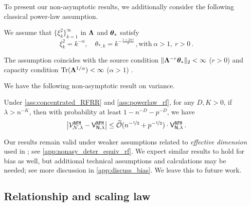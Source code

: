 To present our non-asymptotic results, we additionally consider the following classical power-law assumption.

\begin{assumption}
\label{ass:powerlaw_rf}
    We assume that $\{ \xi_k^2\}_{k=1}^{\infty}$ in ${\boldsymbol \Lambda}$ and ${\boldsymbol \theta}_*$ satisfy
    \[
    \xi_k^2 = k^{-\alpha}, \quad \theta_{\ast, k} = k^{-\frac{1 + 2\alpha\tau}{2}}\,, \mbox{with}~\alpha > 1,~ r>0\,.
    \]
\end{assumption}

The assumption coincides with the source condition $\|{\boldsymbol \Lambda}^{-r} {\boldsymbol \theta}_*\|_2 < \infty$ ($r>0$) and capacity condition ${\rm Tr}({\boldsymbol \Lambda}^{1/\alpha}) < \infty$ ($\alpha > 1$) \citep{caponnetto2007optimal}.

We have the following non-asymptotic result on variance. 
\begin{theorem}\label{prop:non-asy_equiv_norm_RFRR_V}
    Under \cref{ass:concentrated_RFRR} and \ref{ass:powerlaw_rf}, for any $D,K >0$, if $\lambda > n^{-K}$, then with probability at least $1-n^{-D}-p^{-D}$, we have
    \[
    \begin{aligned}
          \left|\mathcal{V}^{\tt RFM}_{\mathcal{N},\lambda} - \mathsf V_{\mathsf N,\lambda}^{\tt RFM}\right| \leq \widetilde{\mathcal{O}}(n^{-\nicefrac{1}{2}}+p^{-\nicefrac{1}{2}}) \cdot \mathsf V_{\mathsf N,\lambda}^{\tt RFM}\,.
    \end{aligned}
    \]
\end{theorem}
 Our results remain valid under weaker assumptions related to \emph{effective dimension} used in \citet{defilippis2024dimension}; see  \cref{app:nonasy_deter_equiv_rf}. 
We expect similar results to hold for bias as well, but additional technical assumptions and calculations may be needed; see more discussion in \cref{app:discuss_bias}.
We leave this to future work.  

\subsection{Relationship and scaling law}\label{sec:relationship_rf}

